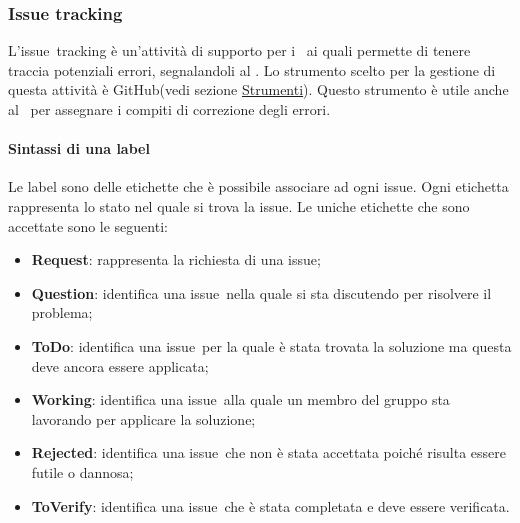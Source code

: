 \documentclass[../NormeProgetto.text]{subfiles}
\begin{document}
	\subsubsection{Issue tracking}
		L'issue\g\ tracking è un'attività di supporto per i \verificatori\ ai quali permette di tenere traccia potenziali errori, segnalandoli al \responsabilediprogetto. Lo strumento scelto per la gestione di questa attività è GitHub(vedi sezione \hyperref[par:IssueTrk GitHub]{Strumenti}). Questo strumento è utile anche al \responsabilediprogetto\ per assegnare i compiti di correzione degli errori. 
		\paragraph{Sintassi di una label}
			Le label sono delle etichette che è possibile associare ad ogni issue\g. Ogni etichetta rappresenta lo stato nel quale si trova la issue\g. Le uniche etichette che sono accettate sono le seguenti:
			\begin{itemize}
				\item \textbf{Request}: rappresenta la richiesta di una issue\g;
				\item \textbf{Question}: identifica una issue\g\ nella quale si sta discutendo per risolvere il problema;
				\item \textbf{ToDo}: identifica una issue\g\ per la quale è stata trovata la soluzione ma questa deve ancora essere applicata;
				\item \textbf{Working}: identifica una issue\g\ alla quale un membro del gruppo sta lavorando per applicare la soluzione;
				\item \textbf{Rejected}: identifica una issue\g\ che non è stata accettata poiché risulta essere futile o dannosa;
				\item \textbf{ToVerify}: identifica una issue\g\ che è stata completata e deve essere verificata.
			\end{itemize}				
\end{document}
